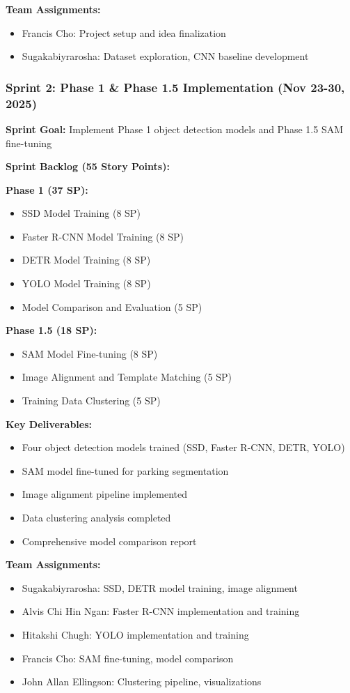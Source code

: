 \documentclass[12pt,a4paper]{article}
\begin{document}
\textbf{Team Assignments:}
\begin{itemize}
    \item Francis Cho: Project setup and idea finalization
    \item Sugakabiyrarosha: Dataset exploration, CNN baseline development
\end{itemize}

\subsubsection{Sprint 2: Phase 1 \& Phase 1.5 Implementation (Nov 23-30, 2025)}

\textbf{Sprint Goal:} Implement Phase 1 object detection models and Phase 1.5 SAM fine-tuning

\textbf{Sprint Backlog (55 Story Points):}

\textbf{Phase 1 (37 SP):}
\begin{itemize}
    \item SSD Model Training (8 SP)
    \item Faster R-CNN Model Training (8 SP)
    \item DETR Model Training (8 SP)
    \item YOLO Model Training (8 SP)
    \item Model Comparison and Evaluation (5 SP)
\end{itemize}

\textbf{Phase 1.5 (18 SP):}
\begin{itemize}
    \item SAM Model Fine-tuning (8 SP)
    \item Image Alignment and Template Matching (5 SP)
    \item Training Data Clustering (5 SP)
\end{itemize}

\textbf{Key Deliverables:}
\begin{itemize}
    \item Four object detection models trained (SSD, Faster R-CNN, DETR, YOLO)
    \item SAM model fine-tuned for parking segmentation
    \item Image alignment pipeline implemented
    \item Data clustering analysis completed
    \item Comprehensive model comparison report
\end{itemize}

\textbf{Team Assignments:}
\begin{itemize}
    \item Sugakabiyrarosha: SSD, DETR model training, image alignment
    \item Alvis Chi Hin Ngan: Faster R-CNN implementation and training
    \item Hitakshi Chugh: YOLO implementation and training
    \item Francis Cho: SAM fine-tuning, model comparison
    \item John Allan Ellingson: Clustering pipeline, visualizations
\end{itemize}
\end{document}
